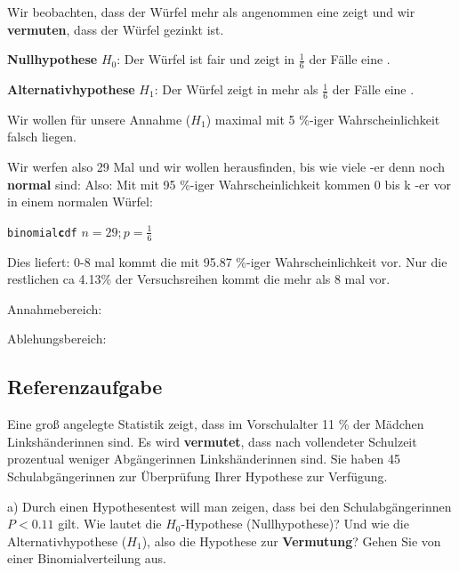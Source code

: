 Wir beobachten, dass der Würfel mehr als angenommen eine 
zeigt und wir \textbf{vermuten}, dass der Würfel gezinkt ist.

\textbf{Nullhypothese} $H_0$: Der Würfel ist fair und zeigt in
$\frac16$ der Fälle eine .

\textbf{Alternativhypothese} $H_1$: Der Würfel zeigt in mehr als
$\frac{1}{6}$ der Fälle eine .

Wir wollen für unsere Annahme ($H_1$) maximal mit 5 \%-iger
Wahrscheinlichkeit falsch liegen.

Wir werfen also 29 Mal und wir wollen herausfinden, bis wie viele
-er denn noch \textbf{normal} sind:
Also: Mit mit 95 \%-iger Wahrscheinlichkeit kommen 0 bis k
-er vor in einem normalen Würfel:

\texttt{binomial\textbf{c}df} $n=29; p=\frac16$

Dies liefert: 0-8 mal kommt die  mit 95.87 \%-iger
Wahrscheinlichkeit vor. Nur die restlichen ca 4.13\% der
Versuchsreihen kommt die  mehr als 8 mal vor.


Annahmebereich:


Ablehungsbereich:


\newpage


\subsection*{Referenzaufgabe}
Eine groß angelegte Statistik zeigt, dass im Vorschulalter 11 \% der
Mädchen Linkshänderinnen sind. Es wird \textbf{vermutet}, dass nach
vollendeter Schulzeit prozentual weniger Abgängerinnen
Linkshänderinnen sind. Sie haben 45 Schulabgängerinnen zur Überprüfung
Ihrer Hypothese zur Verfügung.

a) Durch einen Hypothesentest will man zeigen, dass bei den
Schulabgängerinnen $P < 0.11$ gilt. Wie lautet die $H_0$-Hypothese
(Nullhypothese)? Und wie die Alternativhypothese ($H_1$), also die
Hypothese zur \textbf{Vermutung}? Gehen Sie von einer
Binomialverteilung aus.

 
